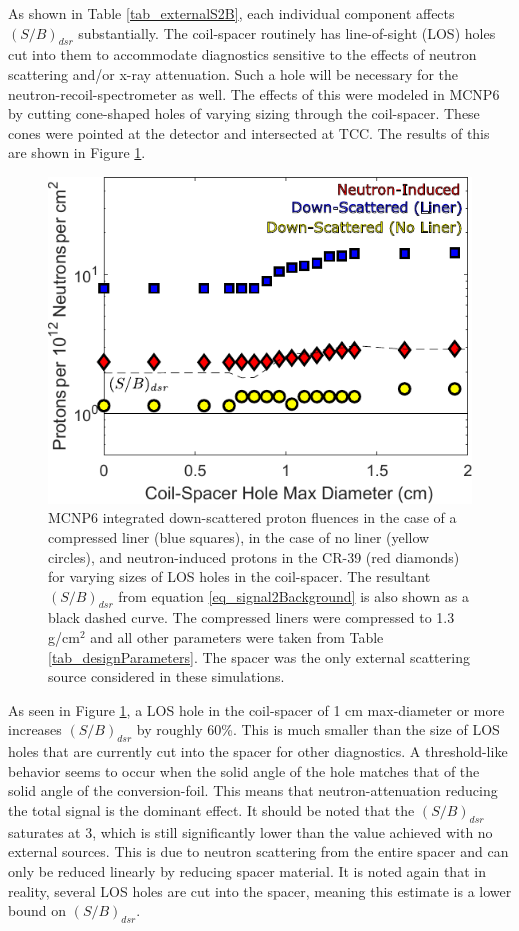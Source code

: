 As shown in Table \ref{tab_externalS2B}, each individual component affects $(S/B)_{dsr}$ substantially. The coil-spacer routinely has line-of-sight (LOS) holes cut into them to accommodate diagnostics sensitive to the effects of neutron scattering and/or x-ray attenuation. Such a hole will be necessary for the neutron-recoil-spectrometer as well. The effects of this were modeled in MCNP6 by cutting cone-shaped holes of varying sizing through the coil-spacer. These cones were pointed at the detector and intersected at TCC. The results of this are shown in Figure \ref{fig_spacerLoS}.

\begin{figure}[h!]
	
	\centering
	\includegraphics[scale=1.5]{Figures/S2B_SpacerHole.pdf}
	\caption{MCNP6 integrated down-scattered proton fluences in the case of a compressed liner (blue squares), in the case of no liner (yellow circles), and neutron-induced protons in the CR-39 (red diamonds) for varying sizes of LOS holes in the coil-spacer. The resultant $(S/B)_{dsr}$ from equation \ref{eq_signal2Background} is also shown as a black dashed curve. The compressed liners were compressed to 1.3 g/cm$^2$ and all other parameters were taken from Table \ref{tab_designParameters}. The spacer was the only external scattering source considered in these simulations.}
	\label{fig_spacerLoS}
	
\end{figure}

As seen in Figure \ref{fig_spacerLoS}, a LOS hole in the coil-spacer of 1 cm max-diameter or more increases $(S/B)_{dsr}$ by roughly 60\%. This is much smaller than the size of LOS holes that are currently cut into the spacer for other diagnostics. A threshold-like behavior seems to occur when the solid angle of the hole matches that of the solid angle of the conversion-foil. This means that neutron-attenuation reducing the total signal is the dominant effect. It should be noted that the $(S/B)_{dsr}$ saturates at 3, which is still significantly lower than the value achieved with no external sources. This is due to neutron scattering from the entire spacer and can only be reduced linearly by reducing spacer material. It is noted again that in reality, several LOS holes are cut into the spacer, meaning this estimate is a lower bound on $(S/B)_{dsr}$.  

